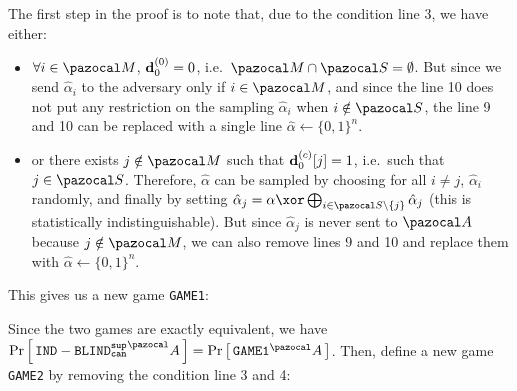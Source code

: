 \begin{proofE}
  The first step in the proof is to note that, due to the condition line 3, we have either:
  \begin{itemize}
    \item $\forall i \in \cM$, $\mathbf{d}_0^{(0)} = 0$, i.e.\ $\cM \cap \cS = \emptyset$. But since we send $\hat{\alpha}_i$ to the adversary only if $i \in \cM$, and since the line 10 does not put any restriction on the sampling $\hat{\alpha}_i$ when $i \notin \cS$, the line 9 and 10 can be replaced with a single line $\hat{\alpha} \gets \{0,1\}^n$.
    \item or there exists $j \notin \cM$ such that $\mathbf{d}_0^{(c)}[j] = 1$, i.e.\ such that $j \in \cS$. Therefore, $\hat{\alpha}$ can be sampled by choosing for all $i \neq j$, $\hat{\alpha}_i$ randomly, and finally by setting $\hat{\alpha}_j = \alpha \xor\bigoplus_{i \in \cS \setminus \{j\}} \hat{\alpha}_j$ (this is statistically indistinguishable). But since $\hat{\alpha}_j$ is never sent to $\cA$ because $j \notin \cM$, we can also remove lines 9 and 10 and replace them with $\hat{\alpha} \gets \{0,1\}^n$.
  \end{itemize}
  This gives us a new game \texttt{GAME1}:
  \begin {pcimage}
    {\normalfont{}}
  \end{pcimage}
  Since the two games are exactly equivalent, we have $\pr{\INDBLINDCANSUP^\cA} = \pr{\texttt{GAME1}^\cA}$. Then, define a new game \texttt{GAME2} by removing the condition line 3 and 4:
  \begin {pcimage}
    {\normalfont{}}
\end{pcimage}
\end{proofE}
